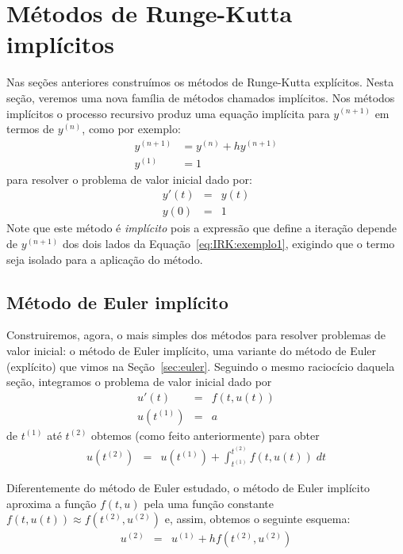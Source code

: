 \section{Métodos de Runge-Kutta implícitos}\label{sec:sec_IRK}
Nas seções anteriores construímos os métodos de Runge-Kutta explícitos. Nesta seção, veremos uma nova família de métodos chamados implícitos. Nos métodos implícitos o processo recursivo produz uma equação implícita para $y^{(n+1)}$ em termos de $y^{(n)}$, como por exemplo:
\begin{equation}\label{eq:IRK:exemplo1}
  \begin{split}
    y^{(n+1)}&=y^{(n)}+h y^{(n+1)}\\
    y^{(1)}&=1
  \end{split}
\end{equation}
para resolver o problema de valor inicial dado por:
\begin{eqnarray}
 y'(t)&=&y(t)\\
 y(0)&=&1
 \end{eqnarray}
Note que este método é \emph{implícito} pois a expressão que define a iteração depende de $y^{(n+1)}$ dos dois lados da Equação~\eqref{eq:IRK:exemplo1}, exigindo que o termo seja isolado para a aplicação do método.


\subsection{Método de Euler implícito}\label{sec:euler_imp}
Construiremos, agora, o mais simples dos métodos para resolver problemas de valor inicial: o método de Euler implícito, uma variante do método de Euler (explícito) que vimos na Seção~\ref{sec:euler}. Seguindo o mesmo raciocício daquela seção, integramos o problema de valor inicial dado por
\begin{eqnarray}
  u'(t)  &=& f(t,u(t)) \\
  u(t^{(1)}) &=& a
\end{eqnarray}
de $t^{(1)}$ até $t^{(2)}$ obtemos (como feito anteriormente) para obter
\begin{eqnarray}
  u(t^{(2)})      &=& u(t^{(1)}) +  \int_{t^{(1)}}^{t^{(2)}} f(t,u(t)) \; dt
\end{eqnarray}

Diferentemente do método de Euler estudado, o método de Euler implícito aproxima a função $f(t,u)$ pela uma função constante $f(t,u(t)) \approx  f(t^{(2)},u^{(2)})$ e, assim, obtemos o seguinte esquema:
\begin{eqnarray}
   u^{(2)} &=&  u^{(1)} + h f(t^{(2)},u^{(2)})
\end{eqnarray}


